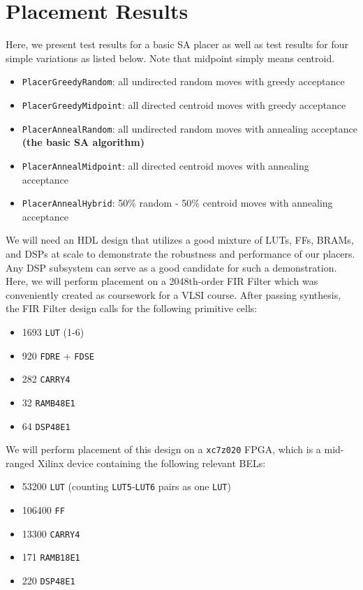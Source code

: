 \section{Placement Results}
\label{sec:results}

Here, we present test results for a basic SA placer as well as test results for four simple variations as listed below. 
Note that midpoint simply means centroid.

\begin{itemize}
    \item \texttt{PlacerGreedyRandom}: all undirected random moves with greedy acceptance
    \item \texttt{PlacerGreedyMidpoint}: all directed centroid moves with greedy acceptance
    \item \texttt{PlacerAnnealRandom}: all undirected random moves with annealing acceptance \textbf{(the basic SA algorithm)}
    \item \texttt{PlacerAnnealMidpoint}: all directed centroid moves with annealing acceptance
    \item \texttt{PlacerAnnealHybrid}: 50\% random - 50\% centroid moves with annealing acceptance
\end{itemize}

We will need an HDL design that utilizes a good mixture of LUTs, FFs, BRAMs, and DSPs at scale to demonstrate the robustness and performance of our placers. 
Any DSP subsystem can serve as a good candidate for such a demonstration. 
Here, we will perform placement on a 2048th-order FIR Filter which was conveniently created as coursework for a VLSI course. 
After passing synthesis, the FIR Filter design calls for the following primitive cells:
\begin{itemize}
    \item 1693 \texttt{LUT} (1-6)
    \item 920 \texttt{FDRE} + \texttt{FDSE}
    \item 282 \texttt{CARRY4}
    \item 32 \texttt{RAMB48E1}
    \item 64 \texttt{DSP48E1}
\end{itemize}

We will perform placement of this design on a \texttt{xc7z020} FPGA, which is a mid-ranged Xilinx device containing the following relevant BELs:
\begin{itemize}
    \item 53200 \texttt{LUT} (counting \texttt{LUT5}-\texttt{LUT6} pairs as one \texttt{LUT})
    \item 106400 \texttt{FF}
    \item 13300 \texttt{CARRY4}
    \item 171 \texttt{RAMB18E1}
    \item 220 \texttt{DSP48E1}
\end{itemize}

